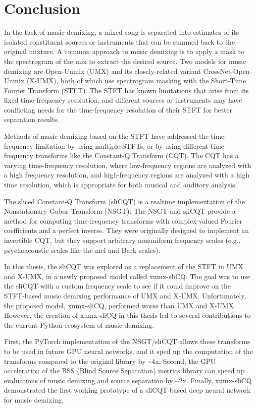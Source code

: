 \documentclass[report.tex]{subfiles}
\begin{document}
\section{Conclusion}
\label{ch:conclusion}

In the task of music demixing, a mixed song is separated into estimates of its isolated constituent sources or instruments that can be summed back to the original mixture. A common approach to music demixing is to apply a mask to the spectrogram of the mix to extract the desired source. Two models for music demixing are Open-Unmix (UMX) and its closely-related variant CrossNet-Open-Unmix (X-UMX), both of which use spectrogram masking with the Short-Time Fourier Transform (STFT). The STFT has known limitations that arise from its fixed time-frequency resolution, and different sources or instruments may have conflicting needs for the time-frequency resolution of their STFT for better separation results.

Methods of music demixing based on the STFT have addressed the time-frequency limitation by using multiple STFTs, or by using different time-frequency transforms like the Constant-Q Transform (CQT). The CQT has a varying time-frequency resolution, where low-frequency regions are analyzed with a high frequency resolution, and high-frequency regions are analyzed with a high time resolution, which is appropriate for both musical and auditory analysis.

The sliced Constant-Q Transform (sliCQT) is a realtime implementation of the Nonstationary Gabor Transform (NSGT). The NSGT and sliCQT provide a method for computing time-frequency transforms with complex-valued Fourier coefficients and a perfect inverse. They were originally designed to implement an invertible CQT, but they support arbitrary nonuniform frequency scales (e.g., psychoacoustic scales like the mel and Bark scales).

In this thesis, the sliCQT was explored as a replacement of the STFT in UMX and X-UMX, in a newly proposed model called xumx-sliCQ. The goal was to use the sliCQT with a custom frequency scale to see if it could improve on the STFT-based music demixing performance of UMX and X-UMX. Unfortunately, the proposed model, xumx-sliCQ, performed worse than UMX and X-UMX. However, the creation of xumx-sliCQ in this thesis led to several contributions to the current Python ecosystem of music demixing.

First, the PyTorch implementation of the NSGT/sliCQT allows these transforms to be used in future GPU neural networks, and it sped up the computation of the transforms compared to the original library by \textasciitilde4x. Second, the GPU acceleration of the BSS (Blind Source Separation) metrics library can speed up evaluations of music demixing and source separation by \textasciitilde2x. Finally, xumx-sliCQ demonstrated the first working prototype of a sliCQT-based deep neural network for music demixing.
\end{document}
